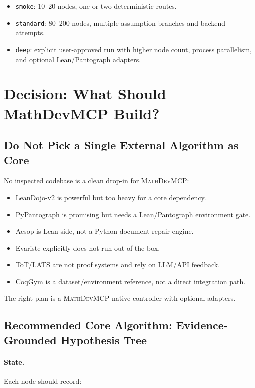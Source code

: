 \documentclass[11pt]{article}
\newcommand{\MathDevMCP}{\textsc{MathDevMCP}}
\begin{document}
\begin{itemize}[leftmargin=*]
\item \texttt{smoke}: 10--20 nodes, one or two deterministic routes.
\item \texttt{standard}: 80--200 nodes, multiple assumption branches and
  backend attempts.
\item \texttt{deep}: explicit user-approved run with higher node count,
  process parallelism, and optional Lean/Pantograph adapters.
\end{itemize}

\section{Decision: What Should MathDevMCP Build?}

\subsection{Do Not Pick a Single External Algorithm as Core}

No inspected codebase is a clean drop-in for \MathDevMCP{}:

\begin{itemize}[leftmargin=*]
\item LeanDojo-v2 is powerful but too heavy for a core dependency.
\item PyPantograph is promising but needs a Lean/Pantograph environment gate.
\item Aesop is Lean-side, not a Python document-repair engine.
\item Evariste explicitly does not run out of the box.
\item ToT/LATS are not proof systems and rely on LLM/API feedback.
\item CoqGym is a dataset/environment reference, not a direct integration path.
\end{itemize}

The right plan is a \MathDevMCP-native controller with optional adapters.

\subsection{Recommended Core Algorithm: Evidence-Grounded Hypothesis Tree}

\paragraph{State.}
Each node should record:
\end{document}
